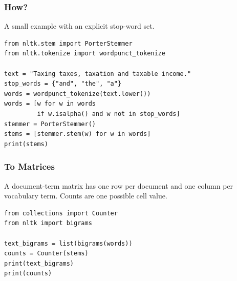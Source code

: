 \documentclass[compress, black]{beamer}
\begin{document}

\begin{frame}[fragile]
\frametitle{How?}
A small example with an explicit stop-word set.
\small
\begin{verbatim}
from nltk.stem import PorterStemmer
from nltk.tokenize import wordpunct_tokenize

text = "Taxing taxes, taxation and taxable income."
stop_words = {"and", "the", "a"}
words = wordpunct_tokenize(text.lower())
words = [w for w in words
         if w.isalpha() and w not in stop_words]
stemmer = PorterStemmer()
stems = [stemmer.stem(w) for w in words]
print(stems)
\end{verbatim}
\end{frame}
\begin{frame}[fragile]
\frametitle{To Matrices}
A document-term matrix has one row per document and one column per vocabulary term. Counts are one possible cell value.
\small
\begin{verbatim}
from collections import Counter
from nltk import bigrams

text_bigrams = list(bigrams(words))
counts = Counter(stems)
print(text_bigrams)
print(counts)
\end{verbatim}
\end{frame}
\end{document}
